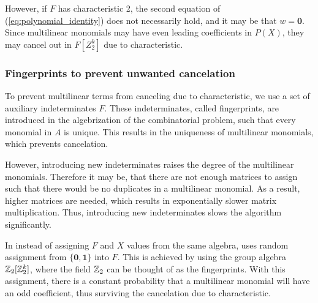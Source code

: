 However, if $F$ has characteristic 2, the second equation of (\ref{eq:polynomial_identity}) 
does not necessarily hold, and it may be that $w = \mathbf{0}$. 
Since multilinear monomials may have even leading coefficients 
in $P(X)$, they may cancel out in $F[Z_2^k]$ due to characteristic.


\subsubsection{Fingerprints to prevent unwanted cancelation}
\label{sect:fingerprints}






To prevent multilinear terms from canceling  due to
characteristic, we use a set of auxiliary indeterminates $F$. 
These indeterminates, called fingerprints, are introduced in the algebrization 
of the combinatorial problem, such that every monomial in $A$ is unique. 
This results in the uniqueness of multilinear monomials, which prevents
cancelation.

However, introducing new indeterminates raises the degree of the multilinear monomials. 
Therefore it may be, that there are not enough matrices to assign such that there would be no 
duplicates in a multilinear monomial. As a result, higher
 matrices are needed, which 
results in exponentially slower matrix multiplication. %
Thus, introducing new indeterminates slows the algorithm significantly. 

In \cite{Koutis08} instead of assigning $F$ and $X$ values from the same algebra, 
\citeauthor{Koutis08} uses random assignment from $\{\mathbf{0}, \mathbf{1}\}$ into $F$. 
This is achieved by using the group algebra $\mathbb Z_2[\mathbb Z_2^k]$, where the field $\mathbb Z_2$ can be 
thought of as the fingerprints. 
With this assignment, there is a constant probability that a multilinear monomial will have an odd coefficient, 
thus surviving the cancelation due to characteristic.

